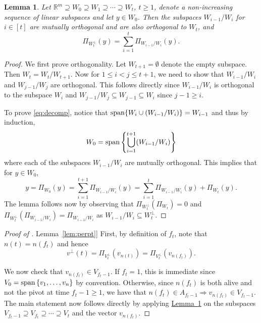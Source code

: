 \documentclass[11pt]{article}
\numberwithin{equation}{section}
\newtheorem{lemma}[theorem]{Lemma}
\theoremstyle{definition}
\theoremstyle{plain}
\newcommand{\R}{\mathbb R}
\newcommand{\expref}[2]{\hyperref[#2]{#1~\ref{#2}}}
\newcommand{\set}[1]{\left\{ #1 \right\}}
\begin{document}
\begin{lemma}
\label{lem:decomp}
Let $\R^m \supseteq W_0 \supseteq W_1 \supseteq \cdots \supseteq W_t $, $t \geq
1$, denote a non-increasing sequence of linear subspaces and let $y \in W_0$.
Then the subspaces $W_{i-1}/W_i$ for $i\in [t]$ are mutually orthogonal and are also orthogonal to $W_t$, and
\begin{equation}
\label{eq:decomp}
\Pi_{W_t^\perp}(y) = \sum_{i=1}^t \Pi_{W_{i-1} / W_i}(y).
\end{equation}
\end{lemma}
\begin{proof}
We first prove orthogonality. Let $W_{t+1}=\emptyset$ denote the empty subspace. Then $W_t = W_t / W_{t+1}$. Now for $1 \leq i < j \leq t+1$, we need to show that
$W_{i-1}/W_i$ and $W_{j-1}/W_j$ are orthogonal. This follows
directly since $W_{i-1}/W_i$ is orthogonal to the subspace $W_i$ and
$W_{j-1}/W_j \subseteq W_{j-1} \subseteq W_i$ since $j-1 \geq i$.

To prove \eqref{eq:decomp}, notice that ${\rm span}\{W_i\cup (W_{i-1}/ W_i)\} =W_{i-1}$ and thus by induction,
\[W_0={\rm span} \left\{ \bigcup_{i=1}^{t+1} (W_{i-1}/ W_i )\right\} \]
where each of the subspaces $W_{i-1}/ W_i$ are mutually orthogonal. This implies that for $y\in W_0$,
\[ y =\Pi_{W_0}(y)= \sum_{i=1}^{t+1} \Pi_{W_{i-1} / W_i}(y)  = \sum_{i=1}^{t} \Pi_{W_{i-1} / W_i}(y) +  \Pi_{W_{t}}(y).\]
The lemma follows now by observing that $\Pi_{W_t^{\perp}} ( \Pi_{W_{t}}) =0 $ and $\Pi_{W_t^{\perp}}(  \Pi_{W_{i-1} / W_i}  )  = \Pi_{W_{i-1} / W_i}$ as $W_{i-1} / W_i \subseteq W_t^{\perp}$.
\end{proof}

\begin{proof}[Proof of \expref{Lemma}{lem:perpt}]
First, by definition of $f_t$, note that $n(t) = n(f_t)$ and hence
\[
v^\perp(t) = \Pi_{V_t^\perp}(v_{n(t)}) = \Pi_{V_t^\perp}(v_{n(f_t)}).
\]

We now check that $v_{n(f_t)} \in V_{f_t-1}$. If $f_t = 1$, this is immediate
since $V_0 = {\rm span}\set{v_1,\ldots,v_n}$ by convention. Otherwise, since $n(f_t)$ is both alive and
not the pivot at time $f_t-1 \geq 1$, we have that $n(f_t) \in A_{f_t-1}
\Rightarrow v_{n(f_t)} \in V_{f_t-1}$. The main statement now follows directly by
applying \expref{Lemma}{lem:decomp} on the subspaces $V_{f_t-1} \supseteq V_{f_t}
\supseteq \cdots \supseteq V_t$ and the vector $v_{n(f_t)}$.
\end{proof}
\end{document}
